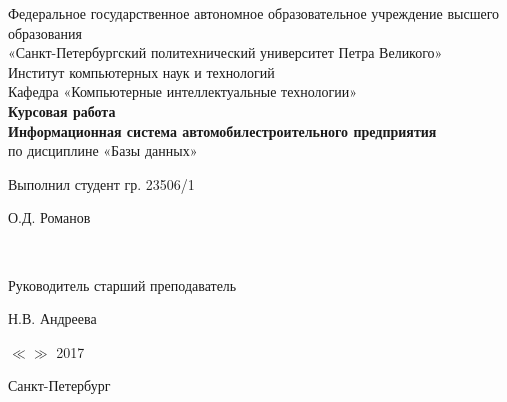 \begin{titlepage}

	\begin{center}

		\large Федеральное государственное автономное образовательное учреждение высшего образования \\
		\large «Санкт-Петербургский политехнический университет Петра Великого» \\
		\large Институт компьютерных наук и технологий \\
		\large Кафедра «Компьютерные интеллектуальные технологии» \\[4cm]

		\huge {\bf Курсовая работа} \\[0.5cm]
		\large {\bf Информационная система автомобилестроительного предприятия} \\[0.1cm]
		\large по дисциплине «Базы данных» \\[4cm]

	\end{center}

    \begin{center}
        \begin{minipage}[t]{4cm}
            \begin{flushleft}
                Выполнил студент гр. 23506/1
            \end{flushleft}
        \end{minipage}
        \hfill
        \begin{minipage}[t]{4cm}
            \begin{flushright}
            О.Д. Романов
            \end{flushright}
        \end{minipage} \\[0.5cm]

        \begin{minipage}[t]{4cm}
            \begin{flushleft}
                Руководитель старший преподаватель
            \end{flushleft}
            \flushleft
        \end{minipage}
        \hfill
        \begin{minipage}[t]{4cm}
            \begin{flushright}
                Н.В. Андреева
            \end{flushright}
        \end{minipage}
    \end{center}

    \begin{flushright}
        $\ll$\underline{\hspace{0.5cm}}$\gg$ \underline{\hspace{1.5cm}} 2017
    \end{flushright}

	
	\vfill

	\begin{center}
	    \large Санкт-Петербург\\
	    \large \the\year
	\end{center}
 
\end{titlepage}